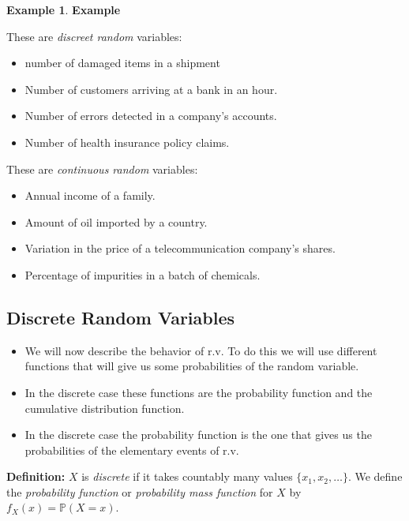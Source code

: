 \documentclass[
]{book}
\providecommand{\tightlist}{%
  \setlength{\itemsep}{0pt}\setlength{\parskip}{0pt}}
\theoremstyle{definition}
\theoremstyle{definition}
\newtheorem{example}{Example}[chapter]
\theoremstyle{definition}
\theoremstyle{definition}
\theoremstyle{remark}
\begin{document}
\begin{example}

\textbf{Example}

These are \emph{discreet random} variables:

\begin{itemize}
\tightlist
\item
  number of damaged items in a shipment
\item
  Number of customers arriving at a bank in an hour.
\item
  Number of errors detected in a company's accounts.
\item
  Number of health insurance policy claims.
\end{itemize}

These are \emph{continuous random} variables:

\begin{itemize}
\tightlist
\item
  Annual income of a family.
\item
  Amount of oil imported by a country.
\item
  Variation in the price of a telecommunication company's shares.
\item
  Percentage of impurities in a batch of chemicals.
\end{itemize}

\end{example}

\hypertarget{discrete-random-variables}{%
\subsection{Discrete Random Variables}\label{discrete-random-variables}}

\begin{itemize}
\tightlist
\item
  We will now describe the behavior of r.v. To do this we will use different functions that will give us some probabilities of the random variable.
\item
  In the discrete case these functions are the probability function and the cumulative distribution function.
\item
  In the discrete case the probability function is the one that gives us the probabilities of the elementary events of r.v.
\end{itemize}

\textbf{Definition:} \(X\) is \emph{discrete} if it takes countably many values \(\{x_1,x_2,\dots\}\). We define the \emph{probability function} or \emph{probability mass function} for \(X\) by \(f_X(x)=\mathbb{P}(X=x)\).
\end{document}
